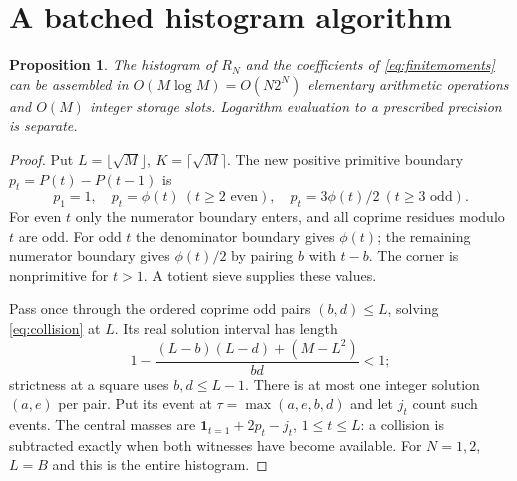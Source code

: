 \documentclass[11pt,a4paper]{article}
\numberwithin{equation}{section}
\newtheorem{proposition}[theorem]{Proposition}
\theoremstyle{remark}
\begin{document}
\section{A batched histogram algorithm}\label{sec:algorithm}
\begin{proposition}\label{prop:algorithm}
The histogram of $R_N$ and the coefficients of
\eqref{eq:finitemoments} can be assembled in $O(M\log M)=O(N2^N)$
elementary arithmetic operations and $O(M)$ integer storage slots.
Logarithm evaluation to a prescribed precision is separate.
\end{proposition}
\begin{proof}
Put $L=\lfloor\sqrt M\rfloor$, $K=\lceil\sqrt M\rceil$.
The new positive primitive boundary $p_t=P(t)-P(t-1)$ is
\[
p_1=1,\quad p_t=\phi(t)\ (t\ge2\text{ even}),\quad
p_t=3\phi(t)/2\ (t\ge3\text{ odd}).
\]
For even $t$ only the numerator boundary enters, and all coprime
residues modulo $t$ are odd. For odd $t$ the denominator boundary
gives $\phi(t)$; the remaining numerator boundary gives $\phi(t)/2$
by pairing $b$ with $t-b$. The corner is nonprimitive for $t>1$.
A totient sieve supplies these values.

Pass once through the ordered coprime odd pairs $(b,d)\le L$, solving
\eqref{eq:collision} at $L$. Its real solution interval has length
\[
1-\frac{(L-b)(L-d)+(M-L^2)}{bd}<1;
\]
strictness at a square uses $b,d\le L-1$. There is at most one
integer solution $(a,e)$ per pair. Put its event at
$\tau=\max(a,e,b,d)$ and let $j_t$ count such events. The central
masses are $\mathbf1_{t=1}+2p_t-j_t$, $1\le t\le L$: a collision
is subtracted exactly when both witnesses have become available.
For $N=1,2$, $L=B$ and this is the entire histogram.


\end{proof}
\end{document}
